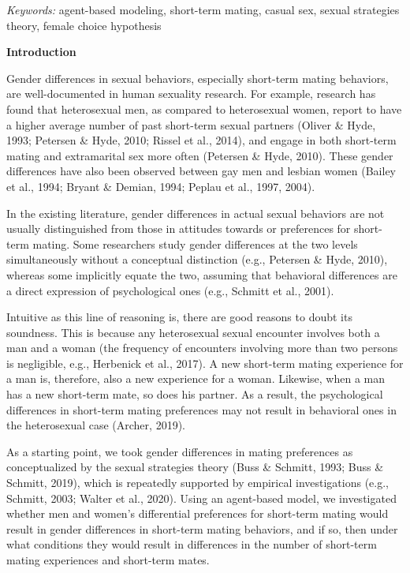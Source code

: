 \documentclass[
  12pt,
]{article}
\begin{document}
\hfill\break

\emph{Keywords:} agent-based modeling, short-term mating, casual sex,
sexual strategies theory, female choice hypothesis

\newpage

\textbf{Introduction}

Gender differences in sexual behaviors, especially short-term mating
behaviors, are well-documented in human sexuality research. For example,
research has found that heterosexual men, as compared to heterosexual
women, report to have a higher average number of past short-term sexual
partners (Oliver \& Hyde, 1993; Petersen \& Hyde, 2010; Rissel et al.,
2014), and engage in both short-term mating and extramarital sex more
often (Petersen \& Hyde, 2010). These gender differences have also been
observed between gay men and lesbian women (Bailey et al., 1994; Bryant
\& Demian, 1994; Peplau et al., 1997, 2004).

In the existing literature, gender differences in actual sexual
behaviors are not usually distinguished from those in attitudes towards
or preferences for short-term mating. Some researchers study gender
differences at the two levels simultaneously without a conceptual
distinction (e.g., Petersen \& Hyde, 2010), whereas some implicitly
equate the two, assuming that behavioral differences are a direct
expression of psychological ones (e.g., Schmitt et al., 2001).

Intuitive as this line of reasoning is, there are good reasons to doubt
its soundness. This is because any heterosexual sexual encounter
involves both a man and a woman (the frequency of encounters involving
more than two persons is negligible, e.g., Herbenick et al., 2017). A
new short-term mating experience for a man is, therefore, also a new
experience for a woman. Likewise, when a man has a new short-term mate,
so does his partner. As a result, the psychological differences in
short-term mating preferences may not result in behavioral ones in the
heterosexual case (Archer, 2019).

As a starting point, we took gender differences in mating preferences as
conceptualized by the sexual strategies theory (Buss \& Schmitt, 1993;
Buss \& Schmitt, 2019), which is repeatedly supported by empirical
investigations (e.g., Schmitt, 2003; Walter et al., 2020). Using an
agent-based model, we investigated whether men and women's differential
preferences for short-term mating would result in gender differences in
short-term mating behaviors, and if so, then under what conditions they
would result in differences in the number of short-term mating
experiences and short-term mates.
\end{document}
